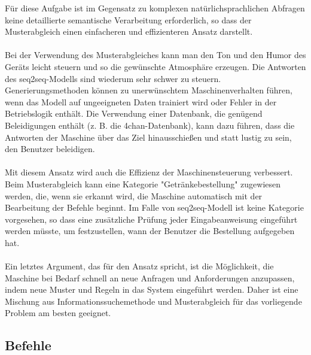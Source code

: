 Für diese Aufgabe ist im Gegensatz zu komplexen natürlichsprachlichen Abfragen keine detaillierte semantische Verarbeitung erforderlich, so dass der Musterabgleich einen einfacheren und effizienteren Ansatz darstellt.\\\\
Bei der Verwendung des Musterabgleiches kann man den Ton und den Humor des Geräts leicht steuern und so die gewünschte Atmosphäre erzeugen. 
Die Antworten des seq2seq-Modells sind wiederum sehr schwer zu steuern. 
Generierungsmethoden können zu unerwünschtem Maschinenverhalten führen, wenn das Modell auf ungeeigneten Daten trainiert wird oder Fehler in der Betriebslogik enthält. 
Die Verwendung einer Datenbank, die genügend Beleidigungen enthält (z. B. die 4chan-Datenbank), kann dazu führen, dass die Antworten der Maschine über das Ziel hinausschießen und statt lustig zu sein, den Benutzer beleidigen.\\\\
Mit diesem Ansatz wird auch die Effizienz der Maschinensteuerung verbessert. 
Beim Musterabgleich kann eine Kategorie "Getränkebestellung" zugewiesen werden, die, wenn sie erkannt wird, die Maschine automatisch mit der Bearbeitung der Befehle beginnt. 
Im Falle von seq2seq-Modell ist keine Kategorie vorgesehen, so dass eine zusätzliche Prüfung jeder Eingabeanweisung eingeführt werden müsste, um festzustellen, wann der Benutzer die Bestellung aufgegeben hat.\\\\
Ein letztes Argument, das für den Ansatz spricht, ist die Möglichkeit, die Maschine bei Bedarf schnell an neue Anfragen und Anforderungen anzupassen, indem neue Muster und Regeln in das System eingeführt werden. 
Daher ist eine Mischung aus Informationssuchemethode und Musterabgleich für das vorliegende Problem am besten geeignet.
\subsection{Befehle}
